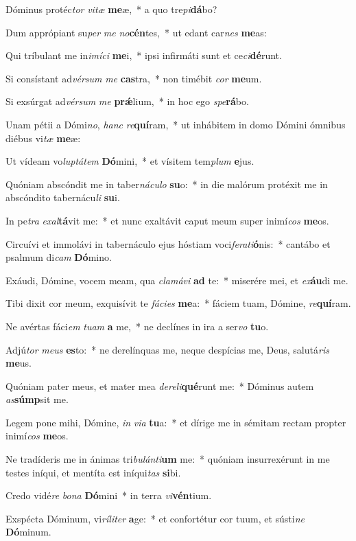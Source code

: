 \item Dóminus protéc\textit{tor} \textit{vi}\textit{tæ} \textbf{me}æ,~* a quo tre\textit{pi}\textbf{dá}bo?
\item Dum apprópiant su\textit{per} \textit{me} \textit{no}\textbf{cén}tes,~* ut edant car\textit{nes} \textbf{me}as:
\item Qui tríbulant me in\textit{i}\textit{mí}\textit{ci} \textbf{me}i,~* ipsi infirmáti sunt et ce\textit{ci}\textbf{dé}runt.
\item Si consístant ad\textit{vér}\textit{sum} \textit{me} \textbf{cas}tra,~* non timébit \textit{cor} \textbf{me}um.
\item Si exsúrgat ad\textit{vér}\textit{sum} \textit{me} \textbf{prǽ}lium,~* in hoc ego \textit{spe}\textbf{rá}bo.
\item Unam pétii a Dómi\textit{no}, \textit{hanc} \textit{re}\textbf{quí}ram,~* ut inhábitem in domo Dómini ómnibus diébus vi\textit{tæ} \textbf{me}æ:
\item Ut vídeam vo\textit{lup}\textit{tá}\textit{tem} \textbf{Dó}mini,~* et vísitem tem\textit{plum} \textbf{e}jus.
\item Quóniam abscóndit me in taber\textit{ná}\textit{cu}\textit{lo} \textbf{su}o:~* in die malórum protéxit me in abscóndito tabernácu\textit{li} \textbf{su}i.
\item In pe\textit{tra} \textit{ex}\textit{al}\textbf{tá}vit me:~* et nunc exaltávit caput meum super inimí\textit{cos} \textbf{me}os.
\item Circuívi et immolávi in tabernáculo ejus hóstiam voci\textit{fe}\textit{ra}\textit{ti}\textbf{ó}nis:~* cantábo et psalmum di\textit{cam} \textbf{Dó}mino.
\item Exáudi, Dómine, vocem meam, qua \textit{cla}\textit{má}\textit{vi} \textbf{ad} te:~* miserére mei, et \textit{ex}\textbf{áu}di me.
\item Tibi dixit cor meum, exquisívit te \textit{fá}\textit{ci}\textit{es} \textbf{me}a:~* fáciem tuam, Dómine, \textit{re}\textbf{quí}ram.
\item Ne avértas fáci\textit{em} \textit{tu}\textit{am} \textbf{a} me,~* ne declínes in ira a ser\textit{vo} \textbf{tu}o.
\item Adjú\textit{tor} \textit{me}\textit{us} \textbf{es}to:~* ne derelínquas me, neque despícias me, Deus, salutá\textit{ris} \textbf{me}us.
\item Quóniam pater meus, et mater mea \textit{de}\textit{re}\textit{li}\textbf{qué}runt me:~* Dóminus autem \textit{as}\textbf{súmp}sit me.
\item Legem pone mihi, Dómine, \textit{in} \textit{vi}\textit{a} \textbf{tu}a:~* et dírige me in sémitam rectam propter inimí\textit{cos} \textbf{me}os.
\item Ne tradíderis me in ánimas tri\textit{bu}\textit{lán}\textit{ti}\textbf{um} me:~* quóniam insurrexérunt in me testes iníqui, et mentíta est iníqui\textit{tas} \textbf{si}bi.
\item Credo vidé\textit{re} \textit{bo}\textit{na} \textbf{Dó}mini~* in terra \textit{vi}\textbf{vén}tium.
\item Exspécta Dóminum, vi\textit{rí}\textit{li}\textit{ter} \textbf{a}ge:~* et confortétur cor tuum, et sústi\textit{ne} \textbf{Dó}minum.
